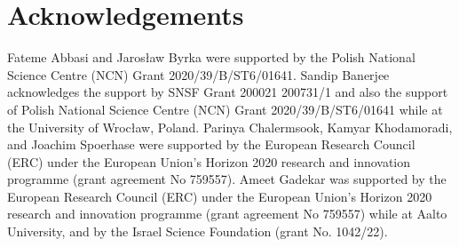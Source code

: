 \documentclass[11pt]{article}
\begin{document}
\section*{Acknowledgements}
Fateme Abbasi and Jaros\l{}aw Byrka were supported by the Polish National Science Centre (NCN) Grant 2020/39/B/ST6/01641. 
Sandip Banerjee acknowledges the support by SNSF Grant 200021 200731/1 and also the support of Polish National Science Centre (NCN) Grant 2020/39/B/ST6/01641 while at the University of Wroc\l{}aw, Poland.
Parinya Chalermsook, Kamyar Khodamoradi, and Joachim Spoerhase were supported by the European Research Council (ERC) under the European Union’s Horizon 2020 research and innovation programme (grant agreement No 759557).  
Ameet Gadekar was supported by the European Research Council (ERC) under the European Union’s Horizon 2020 research and innovation programme (grant agreement No 759557) while at Aalto University, and by the Israel Science Foundation (grant No. 1042/22).
\end{document}
